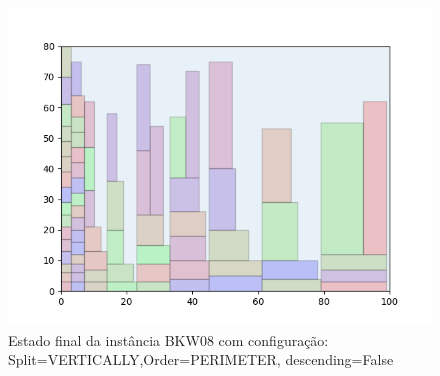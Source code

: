 \begin{figure}[H]
    \centering
    \caption[]{Estado final da instância BKW08 com configuração: Split=VERTICALLY,Order=PERIMETER, descending=False}
    \label{fig:bkw08-vertically-perimeter-false}
    \includegraphics[scale=0.5]{output/figures/bkw/bkw08/vertically/perimeter/false/00}
\end{figure}